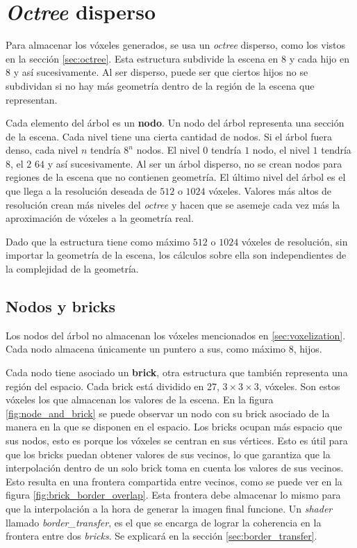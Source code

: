 \section{\textit{Octree} disperso}

Para almacenar los vóxeles generados, se usa un \textit{octree} disperso, como los vistos en la sección \ref{sec:octree}.
Esta estructura subdivide la escena en $8$ y cada hijo en $8$ y así sucesivamente.
Al ser disperso, puede ser que ciertos hijos no se subdividan si no hay más geometría dentro de la región de la escena que representan.

Cada elemento del árbol es un \textbf{nodo}.
Un nodo del árbol representa una sección de la escena.
Cada nivel tiene una cierta cantidad de nodos.
Si el árbol fuera denso, cada nivel $n$ tendría $8^n$ nodos.
El nivel $0$ tendría $1$ nodo, el nivel $1$ tendría $8$, el $2$ $64$ y así sucesivamente.
Al ser un árbol disperso, no se crean nodos para regiones de la escena que no contienen geometría.
El último nivel del árbol es el que llega a la resolución deseada de $512$ o $1024$ vóxeles.
Valores más altos de resolución crean más niveles del \textit{octree} y hacen que se asemeje cada vez más la aproximación de vóxeles a la geometría real.


Dado que la estructura tiene como máximo $512$ o $1024$ vóxeles de resolución, sin importar la geometría de la escena, los cálculos sobre ella son independientes de la complejidad de la geometría.

\subsection{Nodos y bricks}\label{sec:nodes_and_bricks}

Los nodos del árbol no almacenan los vóxeles mencionados en \ref{sec:voxelization}.
Cada nodo almacena únicamente un puntero a sus, como máximo $8$, hijos.

Cada nodo tiene asociado un \textbf{brick}, otra estructura que también representa una región del espacio.
Cada brick está dividido en 27, $3\times3\times3$, vóxeles.
Son estos vóxeles los que almacenan los valores de la escena.
En la figura \ref{fig:node_and_brick} se puede observar un nodo con su brick asociado de la manera en la que se disponen en el espacio.
Los bricks ocupan más espacio que sus nodos, esto es porque los vóxeles se centran en sus vértices.
Esto es útil para que los bricks puedan obtener valores de sus vecinos, lo que garantiza que la interpolación dentro de un solo brick toma en cuenta los valores de sus vecinos.
Esto resulta en una frontera compartida entre vecinos, como se puede ver en la figura \ref{fig:brick_border_overlap}.
Esta frontera debe almacenar lo mismo para que la interpolación a la hora de generar la imagen final funcione.
Un \textit{shader} llamado \textit{border\_transfer}, es el que se encarga de lograr la coherencia en la frontera entre dos \textit{bricks}.
Se explicará en la sección \ref{sec:border_transfer}.

